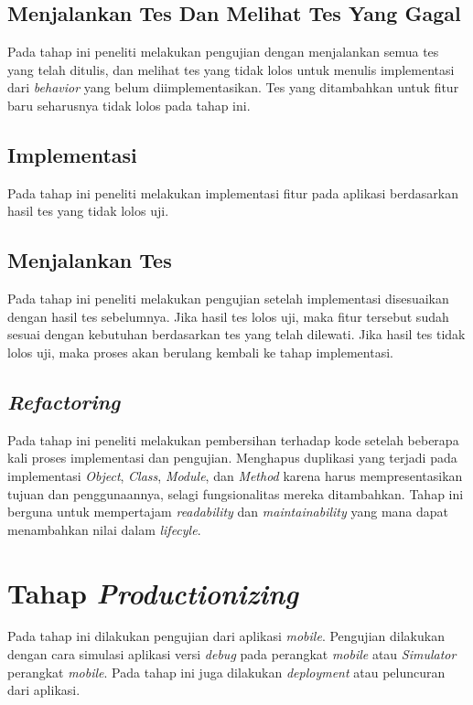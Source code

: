 \begin{spacing}{2}
    \subsection{Menjalankan Tes Dan Melihat Tes Yang Gagal}
      Pada tahap ini peneliti melakukan pengujian dengan menjalankan semua tes yang telah ditulis, dan melihat tes yang tidak lolos untuk menulis implementasi dari \emph{behavior} yang belum diimplementasikan. Tes yang ditambahkan untuk fitur baru seharusnya tidak lolos pada tahap ini.

    \subsection{Implementasi}
      Pada tahap ini peneliti melakukan implementasi fitur pada aplikasi berdasarkan hasil tes yang tidak lolos uji.

    \subsection{Menjalankan Tes}
      Pada tahap ini peneliti melakukan pengujian setelah implementasi disesuaikan dengan hasil tes sebelumnya. Jika hasil tes lolos uji, maka fitur tersebut sudah sesuai dengan kebutuhan berdasarkan tes yang telah dilewati. Jika hasil tes tidak lolos uji, maka proses akan berulang kembali ke tahap implementasi.

    \subsection{\emph{Refactoring}}
      Pada tahap ini peneliti melakukan pembersihan terhadap kode setelah beberapa kali proses implementasi dan pengujian. Menghapus duplikasi yang terjadi pada implementasi \emph{Object}, \emph{Class}, \emph{Module}, dan \emph{Method} karena harus mempresentasikan tujuan dan penggunaannya, selagi fungsionalitas mereka ditambahkan. Tahap ini berguna untuk mempertajam \emph{readability} dan \emph{maintainability} yang mana dapat menambahkan nilai dalam \emph{lifecyle}.

  \section{Tahap \emph{Productionizing}}
    Pada tahap ini dilakukan pengujian dari aplikasi \emph{mobile}. Pengujian dilakukan dengan cara simulasi aplikasi versi \emph{debug} pada perangkat \emph{mobile} atau \emph{Simulator} perangkat \emph{mobile}. Pada tahap ini juga dilakukan \emph{deployment} atau peluncuran dari aplikasi.


\end{spacing}
